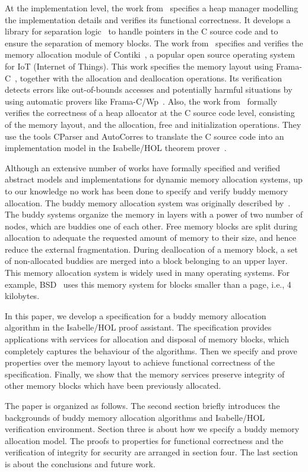 At the implementation level, the work from~\cite{reg_marti} specifies a heap manager modelling the implementation details and verifies its functional correctness. It develops a library for separation logic~\cite{reg_reynolds} to handle pointers in the C source code and to ensure the separation of memory blocks. The work from~\cite{reg_mangano} specifies and verifies the memory allocation module of Contiki~\cite{reg_dunkers}, a popular open source operating system for IoT (Internet of Things). This work specifies the memory layout using Frama-C~\cite{reg_kirchner}, together with the allocation and deallocation operations. Its verification detects errors like out-of-bounds accesses and potentially harmful situations by using automatic provers like Frama-C/Wp~\cite{reg_allan}. Also, the work from~\cite{reg_sahebolamri} formally verifies the correctness of a heap allocator at the C source code level, consisting of the memory layout, and the allocation, free and initialization operations. They use the tools CParser and AutoCorres to translate the C source code into an implementation model in the Isabelle/HOL theorem prover~\cite{reg_Isabelle/HOL}.

Although an extensive number of works have formally specified and verified abstract models and implementations for dynamic memory allocation systems, up to our knowledge no work has been done to specify and verify buddy memory allocation. The buddy memory allocation system was originally described by~\cite{reg_knowlton}. The buddy systems organize the memory in layers with a power of two number of nodes, which are buddies one of each other. Free memory blocks are split during allocation to adequate the requested amount of memory to their size, and hence reduce the external fragmentation. During deallocation of a memory block, a set of non-allocated buddies are merged into a block belonging to an upper layer. This memory allocation system is widely used in many operating systems. For example, BSD~\cite{reg_mckusick} uses this memory system for blocks smaller than a page, i.e., 4 kilobytes.

In this paper, we develop a specification for a buddy memory allocation algorithm in the Isabelle/HOL proof assistant. The specification provides applications with services for allocation and disposal of memory blocks, which completely captures the behaviour of the algorithms. Then we specify and prove properties  over the memory layout to achieve functional correctness of the specification. Finally, we show that the memory services preserve integrity of other memory blocks which have been previously allocated.

The paper is organized as follows. The second section briefly introduces the backgrounds of buddy memory allocation algorithms and Isabelle/HOL verification environment. Section three is about how we specify a buddy memory allocation model. The proofs to properties for functional correctness and the verification of integrity for security are arranged in section four. The last section is about the conclusions and future work.
